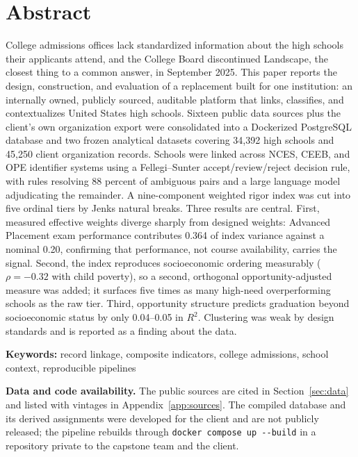 \documentclass[12pt]{article}
\begin{document}
\section*{Abstract}
\noindent College admissions offices lack standardized information about the high schools their applicants attend, and the College Board discontinued Landscape, the closest thing to a common answer, in September 2025. This paper reports the design, construction, and evaluation of a replacement built for one institution: an internally owned, publicly sourced, auditable platform that links, classifies, and contextualizes United States high schools. Sixteen public data sources plus the client's own organization export were consolidated into a Dockerized PostgreSQL database and two frozen analytical datasets covering 34{,}392 high schools and 45{,}250 client organization records. Schools were linked across NCES, CEEB, and OPE identifier systems using a Fellegi--Sunter accept/review/reject decision rule, with rules resolving 88 percent of ambiguous pairs and a large language model adjudicating the remainder. A nine-component weighted rigor index was cut into five ordinal tiers by Jenks natural breaks. Three results are central. First, measured effective weights diverge sharply from designed weights: Advanced Placement exam performance contributes 0.364 of index variance against a nominal 0.20, confirming that performance, not course availability, carries the signal. Second, the index reproduces socioeconomic ordering measurably ($\rho = -0.32$ with child poverty), so a second, orthogonal opportunity-adjusted measure was added; it surfaces five times as many high-need overperforming schools as the raw tier. Third, opportunity structure predicts graduation beyond socioeconomic status by only 0.04--0.05 in $R^2$. Clustering was weak by design standards and is reported as a finding about the data.
\bigskip

\noindent\textbf{Keywords:} record linkage, composite indicators, college admissions, school context, reproducible pipelines

\bigskip
\noindent\textbf{Data and code availability.} The public sources are cited in Section~\ref{sec:data} and listed with vintages in Appendix~\ref{app:sources}. The compiled database and its derived assignments were developed for the client and are not publicly released; the pipeline rebuilds through \texttt{docker compose up -{}-build} in a repository private to the capstone team and the client.
\end{document}
